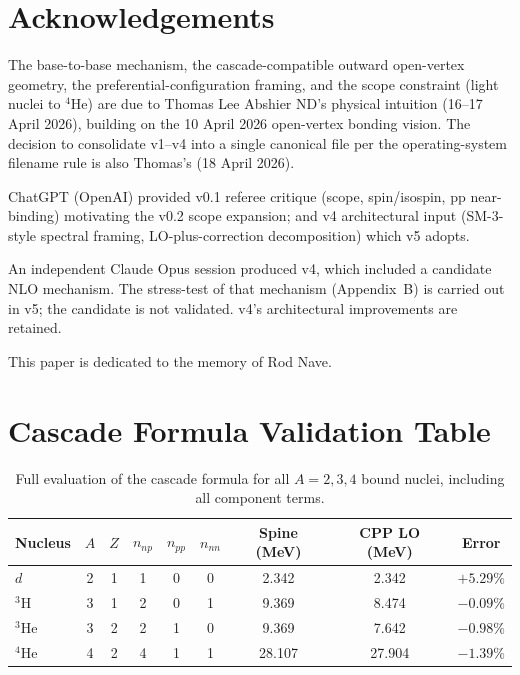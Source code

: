 \documentclass[11pt,letterpaper]{article}
\newcommand{\npnp}{n_{np}}
\newcommand{\npp}{n_{pp}}
\newcommand{\nnn}{n_{nn}}
\begin{document}
\section*{Acknowledgements}

The base-to-base mechanism, the cascade-compatible outward open-vertex geometry, the preferential-configuration framing, and the scope constraint (light nuclei to ${}^4$He) are due to Thomas Lee Abshier ND's physical intuition (16--17 April 2026), building on the 10 April 2026 open-vertex bonding vision. The decision to consolidate v1--v4 into a single canonical file per the operating-system filename rule is also Thomas's (18 April 2026).

ChatGPT (OpenAI) provided v0.1 referee critique (scope, spin/isospin, pp near-binding) motivating the v0.2 scope expansion; and v4 architectural input (SM-3-style spectral framing, LO-plus-correction decomposition) which v5 adopts.

An independent Claude Opus session produced v4, which included a candidate NLO mechanism. The stress-test of that mechanism (Appendix~B) is carried out in v5; the candidate is not validated. v4's architectural improvements are retained.

This paper is dedicated to the memory of Rod Nave.

\appendix
\section{Cascade Formula Validation Table}
\label{app:validation}

\begin{table}[H]
\centering
\caption{Full evaluation of the cascade formula for all $A = 2, 3, 4$ bound nuclei, including all component terms.}
\begin{tabular}{@{}lcccccccc@{}}
\toprule
Nucleus & $A$ & $Z$ & $\npnp$ & $\npp$ & $\nnn$ & Spine (MeV) & CPP LO (MeV) & Error \\
\midrule
$d$      & 2 & 1 & 1 & 0 & 0 & 2.342  & 2.342   & $+5.29\%$ \\
${}^3$H  & 3 & 1 & 2 & 0 & 1 & 9.369  & 8.474   & $-0.09\%$ \\
${}^3$He & 3 & 2 & 2 & 1 & 0 & 9.369  & 7.642   & $-0.98\%$ \\
${}^4$He & 4 & 2 & 4 & 1 & 1 & 28.107 & 27.904  & $-1.39\%$ \\
\bottomrule
\end{tabular}
\end{table}
\end{document}
